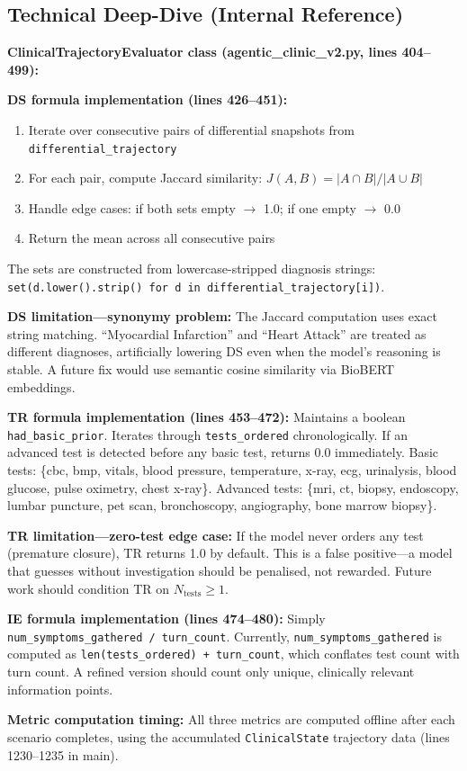 \subsection*{Technical Deep-Dive (Internal Reference)}
{\color{techgray}
\textbf{ClinicalTrajectoryEvaluator class (agentic\_clinic\_v2.py, lines 404--499):}

\textbf{DS formula implementation (lines 426--451):}
\begin{enumerate}
  \item Iterate over consecutive pairs of differential snapshots from \texttt{differential\_trajectory}
  \item For each pair, compute Jaccard similarity: $J(A, B) = |A \cap B| / |A \cup B|$
  \item Handle edge cases: if both sets empty $\to$ 1.0; if one empty $\to$ 0.0
  \item Return the mean across all consecutive pairs
\end{enumerate}
The sets are constructed from lowercase-stripped diagnosis strings: \texttt{set(d.lower().strip() for d in differential\_trajectory[i])}.

\textbf{DS limitation---synonymy problem:} The Jaccard computation uses exact string matching. ``Myocardial Infarction'' and ``Heart Attack'' are treated as different diagnoses, artificially lowering DS even when the model's reasoning is stable. A future fix would use semantic cosine similarity via BioBERT embeddings.

\textbf{TR formula implementation (lines 453--472):} Maintains a boolean \texttt{had\_basic\_prior}. Iterates through \texttt{tests\_ordered} chronologically. If an advanced test is detected before any basic test, returns 0.0 immediately. Basic tests: \{cbc, bmp, vitals, blood pressure, temperature, x-ray, ecg, urinalysis, blood glucose, pulse oximetry, chest x-ray\}. Advanced tests: \{mri, ct, biopsy, endoscopy, lumbar puncture, pet scan, bronchoscopy, angiography, bone marrow biopsy\}.

\textbf{TR limitation---zero-test edge case:} If the model never orders any test (premature closure), TR returns 1.0 by default. This is a false positive---a model that guesses without investigation should be penalised, not rewarded. Future work should condition TR on $N_{\text{tests}} \geq 1$.

\textbf{IE formula implementation (lines 474--480):} Simply \texttt{num\_symptoms\_gathered / turn\_count}. Currently, \texttt{num\_symptoms\_gathered} is computed as \texttt{len(tests\_ordered) + turn\_count}, which conflates test count with turn count. A refined version should count only unique, clinically relevant information points.

\textbf{Metric computation timing:} All three metrics are computed offline after each scenario completes, using the accumulated \texttt{ClinicalState} trajectory data (lines 1230--1235 in main).
}

